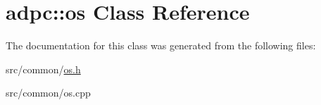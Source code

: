\hypertarget{classadpc_1_1os}{}\section{adpc\+:\+:os Class Reference}
\label{classadpc_1_1os}


The documentation for this class was generated from the following files\+:\begin{DoxyCompactItemize}
\item 
src/common/\hyperlink{os_8h}{os.\+h}\item 
src/common/os.\+cpp\end{DoxyCompactItemize}
